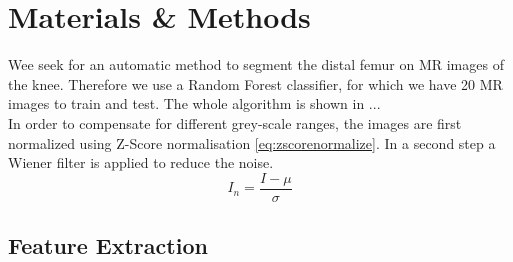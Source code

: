 \section{Materials \& Methods}
Wee seek for an automatic method to segment the distal femur on MR images of the knee. Therefore we use a Random Forest classifier, for which we have 20 MR images to train and test. The whole algorithm is shown in ... \\
In order to compensate for different grey-scale ranges, the images are first normalized using Z-Score normalisation \autoref{eq:zscorenormalize}. In a second step a Wiener filter is applied to reduce the noise. 
\begin{equation}
I_n = \frac{I - \mu}{\sigma}
\label{eq:zscorenormalize}
\end{equation}
\subsection{Feature Extraction}



